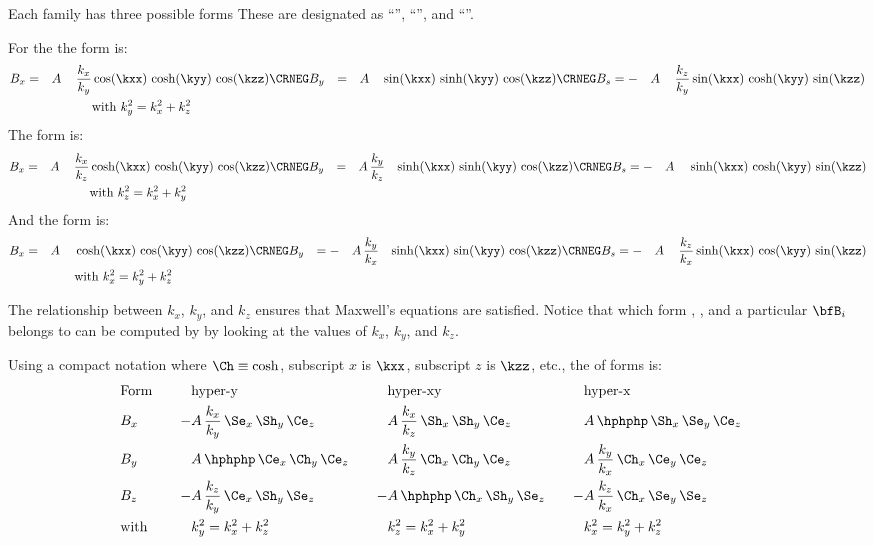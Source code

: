 Each family has three possible forms These are designated as ``'',
``'', and ``''. 

For the   the  form is:
\begin{alignat}{4}
  B_x &=  &&A \, &\dfrac{k_x}{k_y} & \cos(\kxx) \, \cosh(\kyy) \, \cos(\kzz) \CRNEG
  B_y &=  &&A \, &                 & \sin(\kxx) \, \sinh(\kyy) \, \cos(\kzz) \CRNEG
  B_s &= -&&A \, &\dfrac{k_z}{k_y} & \sin(\kxx) \, \cosh(\kyy) \, \sin(\kzz) \label{cm1} \\
  &&&&& \text{with} \,\, k_y^2 = k_x^2 + k_z^2 \nonumber
\end{alignat}
The    form is:
\begin{alignat}{4}
  B_x &=  &&A \, &\dfrac{k_x}{k_z} & \cosh(\kxx) \, \cosh(\kyy) \, \cos(\kzz) \CRNEG
  B_y &=  &&A \, &\dfrac{k_y}{k_z} & \sinh(\kxx) \, \sinh(\kyy) \, \cos(\kzz) \CRNEG
  B_s &= -&&A \, &                 & \sinh(\kxx) \, \cosh(\kyy) \, \sin(\kzz) \label{cm3} \\
  &&&&& \text{with} \,\, k_z^2 = k_x^2 + k_y^2 \nonumber
\end{alignat}
And the    form is:
\begin{alignat}{4}
  B_x &=  &&A \, &                 & \cosh(\kxx) \, \cos(\kyy) \, \cos(\kzz) \CRNEG
  B_y &= -&&A \, &\dfrac{k_y}{k_x} & \sinh(\kxx) \, \sin(\kyy) \, \cos(\kzz) \CRNEG
  B_s &= -&&A \, &\dfrac{k_z}{k_x} & \sinh(\kxx) \, \cos(\kyy) \, \sin(\kzz) \label{cm5} \\
  &&&&& \text{with} \,\, k_x^2 = k_y^2 + k_z^2 \nonumber
\end{alignat}

The relationship between $k_x$, $k_y$, and $k_z$ ensures that
Maxwell's equations are satisfied. Notice that which form
, , and  a particular $\bfB_i$
belongs to can be computed by \bmad by looking at the values of $k_x$,
$k_y$, and $k_z$.

Using a compact notation where $\Ch \equiv \cosh$, subscript $x$ is $\kxx$, subscript $z$
is $\kzz$, etc., the   of forms is:
\begin{alignat}{7}
  & \text{Form} \quad  && \text{hyper-y} \quad && \text{hyper-xy} \quad && \text{hyper-x} \quad \CRNO
  & B_x  
    &-& A \, \dfrac{k_x}{k_y} \, \Se_x \, \Sh_y \, \Ce_z \quad
    & & A \, \dfrac{k_x}{k_z} \, \Sh_x \, \Sh_y \, \Ce_z \quad
    & & A \, \hphphp          \, \Sh_x \, \Se_y \, \Ce_z \quad \CRNO
  & B_y
    & & A \, \hphphp          \, \Ce_x \, \Ch_y \, \Ce_z \quad
    & & A \, \dfrac{k_y}{k_z} \, \Ch_x \, \Ch_y \, \Ce_z \quad
    & & A \, \dfrac{k_y}{k_x} \, \Ch_x \, \Ce_y \, \Ce_z \quad \label{family.y} \\
  & B_z
    &-& A \, \dfrac{k_z}{k_y} \, \Ce_x \, \Sh_y \, \Se_z \quad
    &-& A \, \hphphp          \, \Ch_x \, \Sh_y \, \Se_z \quad
    &-& A \, \dfrac{k_z}{k_x} \, \Ch_x \, \Se_y \, \Se_z \quad \CRNO
  & \text{with} 
    && k_y^2 = k_x^2 + k_z^2 
    && k_z^2 = k_x^2 + k_y^2
    && k_x^2 = k_y^2 + k_z^2 \nonumber
\end{alignat}

